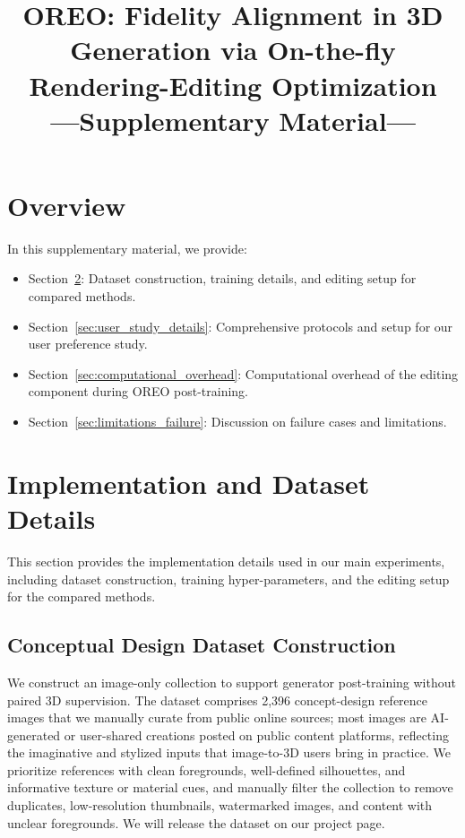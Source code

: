 \documentclass[runningheads]{llncs}
\begin{document}
\title{OREO: Fidelity Alignment in 3D Generation via On-the-fly Rendering-Editing Optimization\\---Supplementary Material---}


\author{}
\institute{}

\maketitle

\section{Overview}
In this supplementary material, we provide:
\begin{itemize}
  \item Section~\ref{sec:implementation_details}: Dataset construction, training details, and editing setup for compared methods.
  \item Section~\ref{sec:user_study_details}: Comprehensive protocols and setup for our user preference study.
  \item Section~\ref{sec:computational_overhead}: Computational overhead of the editing component during OREO post-training.
  \item Section~\ref{sec:limitations_failure}: Discussion on failure cases and limitations.
\end{itemize}

\section{Implementation and Dataset Details}
\label{sec:implementation_details}
This section provides the implementation details used in our main experiments, including dataset construction, training hyper-parameters, and the editing setup for the compared methods.

\subsection{Conceptual Design Dataset Construction}
\label{sec:dataset_construction}
We construct an image-only collection to support generator post-training without paired 3D supervision.
The dataset comprises 2,396 concept-design reference images that we manually curate from public online sources; most images are AI-generated or user-shared creations posted on public content platforms, reflecting the imaginative and stylized inputs that image-to-3D users bring in practice.
We prioritize references with clean foregrounds, well-defined silhouettes, and informative texture or material cues, and manually filter the collection to remove duplicates, low-resolution thumbnails, watermarked images, and content with unclear foregrounds.
We will release the dataset on our project page.
\end{document}
